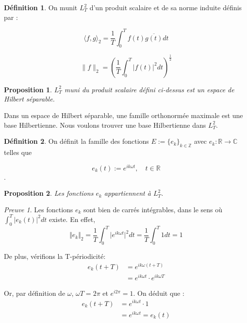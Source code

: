 \documentclass[]{article}
\newtheorem{myproposition}{Proposition}
\theoremstyle{remark}
\newtheorem{myproof}{Preuve}
\theoremstyle{definition}
\newtheorem{mydef}{Définition}
\begin{document}
			\begin{mydef} 
				On munit $L^2_T$ d'un produit scalaire et de sa norme induite définis par : 
			
			
				$$ \langle f,g \rangle_2 = \frac{1}{T} \int_{0}^{T} f(t) \overline{g(t)} dt$$
				
				$$ \| f \|_2 =  \left(\frac{1}{T} \int_0^T | f(t) |^2 dt\right)^{\frac{1}{2}}$$	
				
			\end{mydef}
			
			\begin{myproposition}
				$L^2_T$ muni du produit scalaire défini ci-dessus est un espace de Hilbert séparable.
			\end{myproposition}
		 
			
			Dans un espace de Hilbert séparable, une famille orthonormée maximale est une base Hilbertienne. Nous voulons trouver une base Hilbertienne dans $L_T^2$.
			
			\begin{mydef}
				On définit la famille des fonctions $E:= \{e_k\}_{k \in \mathbb{Z}}$ avec $e_k:\mathbb{R} \to \mathbb{C}$ telles que
				
				$$e_k(t):=e^{ik\omega t}, \quad t\in \mathbb{R}$$.	
			\end{mydef}
			
			
			\begin{myproposition}
				Les fonctions $e_k$ appartiennent à $L^2_T$. 
			\end{myproposition}
			
			\begin{myproof}
				Les fonctions $e_k$ sont bien de carrés intégrables, dans le sens où $\int_0^T \vert e_k(t)\vert ^2 dt$ existe. En effet, 
				$$ \Vert e_k \Vert_2 = \frac{1}{T}  \int_0^T \vert e^{ik\omega t} \vert ^2dt =  \frac{1}{T}  \int_0^T 1 dt = 1 $$
				
				
				De plus, vérifions la T-périodicité: 
				\begin{align*}
				 e_k(t+T) &= e^{ik\omega(t+T)}
				\\ & = e^{ik\omega t} \cdot e^{ik\omega T}
				\end{align*}
				
				Or, par définition de $\omega$, $\omega T = 2\pi$ et $e^{i2\pi}= 1$. On déduit que : 
				\begin{align*}
				e_k(t+T) &= e^{ik\omega t} \cdot 1 
				\\ &= e^{ik\omega t} = e_k(t) 
				\end{align*}
				
			\end{myproof}
			
\end{document}

